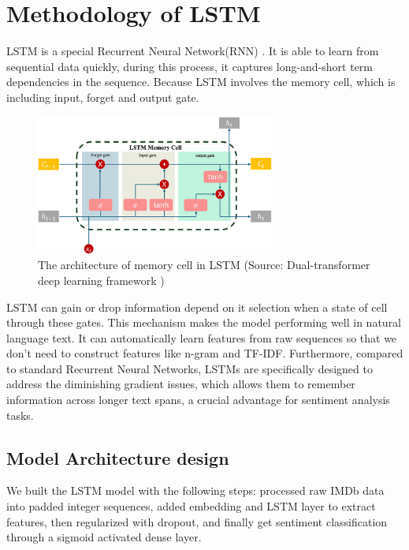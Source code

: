 \section{Methodology of LSTM}
LSTM is a special Recurrent Neural Network(RNN) \cite{sak2014long}. It is able to learn from sequential data quickly, during this process, it captures long-and-short term dependencies in the sequence. Because LSTM involves the memory cell, which is including input, forget and output gate.

\begin{figure}[ht]
    \centering
    \includegraphics[width=0.7\textwidth]{pics/lstm_memory_cell.png}
    \caption{The architecture of memory cell in LSTM (Source: Dual-transformer deep learning framework \cite{chen2025dual})}
\end{figure}

LSTM can gain or drop information depend on it selection when a state of cell through these gates. This mechanism makes the model performing well in natural language text. It can automatically learn features from raw sequences so that we don't need to construct features like n-gram and TF-IDF. Furthermore, compared to standard Recurrent Neural Networks, LSTMs are specifically designed to address the diminishing gradient issues, which allows them to remember information across longer text spans, a crucial advantage for sentiment analysis tasks.

\subsection{Model Architecture design}
We built the LSTM model with the following steps: processed raw IMDb data into padded integer sequences, added embedding and LSTM layer to extract features, then regularized with dropout, and finally get sentiment classification through a sigmoid activated dense layer.


